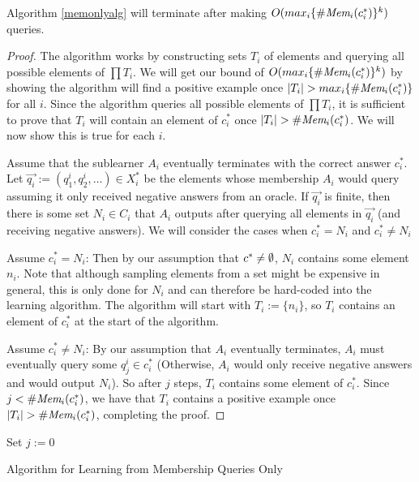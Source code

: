 \begin{proposition}
Algorithm \ref{memonlyalg} will terminate after making $O(max_i \{ \#\emph{Mem}_{i}(c^*_i) \}^k)$ queries.
\end{proposition}
\begin{proof}
The algorithm works by constructing sets $T_i$ of elements and querying all possible elements of $\prod T_i$. 
We will get our bound of $O(max_i \{ \#\emph{Mem}_{i}(c^*_i) \}^k)$ by showing the algorithm will find a positive example once $| T_i | > max_i \{ \#\emph{Mem}_{i}(c^*_i) \}$ for all $i$. 
Since the algorithm queries all possible elements of $\prod T_i$, it is sufficient to prove that $T_i$ will contain an element of $c^*_i$ once $|T_i| > \#\emph{Mem}_{i}(c^*_i)$.
We will now show this is true for each $i$.

Assume that the sublearner $A_i$ eventually terminates with the correct answer $c^*_i$. 
Let $\vec{q_i} := (q_1^i, q_2^i, \dots) \in X_i^*$ be the elements whose membership $A_i$ would query assuming it only received negative answers from an oracle. 
If $\vec{q_i}$ is finite, then there is some set $N_i \in C_i$ that $A_i$ outputs after querying all elements in $\vec{q_i}$ (and receiving negative answers). 
We will consider the cases when $c^*_i = N_i$ and $c^*_i \ne N_i$

Assume $c^*_i = N_i$: Then by our assumption that $c^* \ne \emptyset$, $N_i$ contains some element $n_i$. 
Note that although sampling elements from a set might be expensive in general, this is only done for $N_i$ and can therefore be hard-coded into the learning algorithm. 
The algorithm will start with $T_i := \{n_i\}$, so $T_i$ contains an element of $c^*_i$ at the start of the algorithm. 

Assume $c^*_i \ne N_i$: By our assumption that $A_i$ eventually terminates, $A_i$ must eventually query some $q_j^i \in c^*_i$ (Otherwise, $A_i$ would only receive negative answers and would output $N_i$). 
So after $j$ steps, $T_i$ contains some element of $c^*_i$.
Since $j < \#\emph{Mem}_{i}(c^*_i)$, we have that $T_i$ contains a positive example once $| T_i | > \#\emph{Mem}_{i}(c^*_i)$, completing the proof.  
\end{proof}






\begin{algorithm}[H]
\label{memonlyalg}
\SetAlgoLined
Set $j := 0$\;
\caption{Algorithm for Learning from Membership Queries Only}
\end{algorithm}